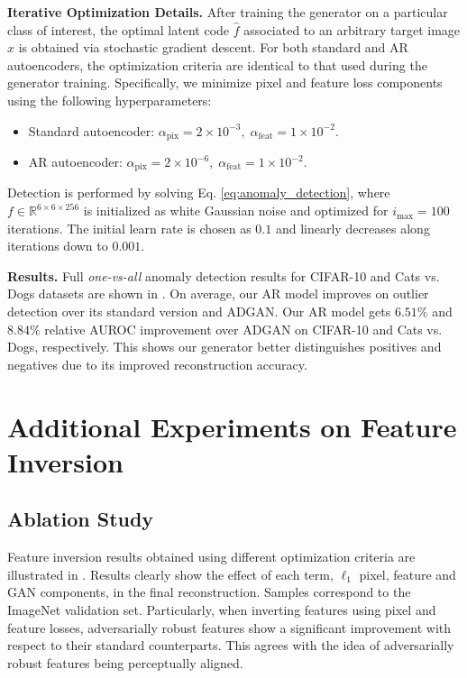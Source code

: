 \textbf{Iterative Optimization Details.} After training the generator on a particular class of interest, the optimal latent code $\hat{f}$ associated to an arbitrary target image $x$ is obtained via stochastic gradient descent. For both standard and AR autoencoders, the optimization criteria are identical to that used during the generator training. Specifically, we minimize pixel and feature loss components using the following hyperparameters:
\vspace{-0.1\baselineskip}
\begin{itemize}
    \setlength\itemsep{0.1\baselineskip}
    \item Standard autoencoder: $\alpha_{\text{pix}}=2\times 10^{-3},\; \alpha_{\text{feat}}=1\times 10^{-2}$.
    \item AR autoencoder: $\alpha_{\text{pix}}=2\times 10^{-6},\; \alpha_{\text{feat}}=1\times 10^{-2}$.
\end{itemize}

Detection is performed by solving Eq. \eqref{eq:anomaly_detection}, where $f\in \mathbb{R}^{6 \times 6 \times 256}$ is initialized as white Gaussian noise and optimized for $i_{\text{max}}=100$ iterations. The initial learn rate is chosen as $0.1$ and linearly decreases along iterations down to $0.001$.

\textbf{Results.} Full \textit{one-vs-all} anomaly detection results for CIFAR-10 and Cats vs. Dogs datasets are shown in . On average, our AR model improves on outlier detection over its standard version and ADGAN. Our AR model gets $6.51\%$ and $8.84\%$ relative AUROC improvement over ADGAN on CIFAR-10 and Cats vs. Dogs, respectively. This shows our generator better distinguishes positives and negatives due to its improved reconstruction accuracy.


\section{Additional Experiments on Feature Inversion}
\label{sec:supp_results}

\subsection{Ablation Study}
\label{sec:supp_results_ablation}

Feature inversion results obtained using different optimization criteria are illustrated in . Results clearly show the effect of each term, $\ell_{1}$ pixel, feature and GAN components, in the final reconstruction. Samples correspond to the ImageNet validation set. Particularly, when inverting features using pixel and feature losses, adversarially robust features show a significant improvement with respect to their standard counterparts. This agrees with the idea of adversarially robust features being perceptually aligned.


